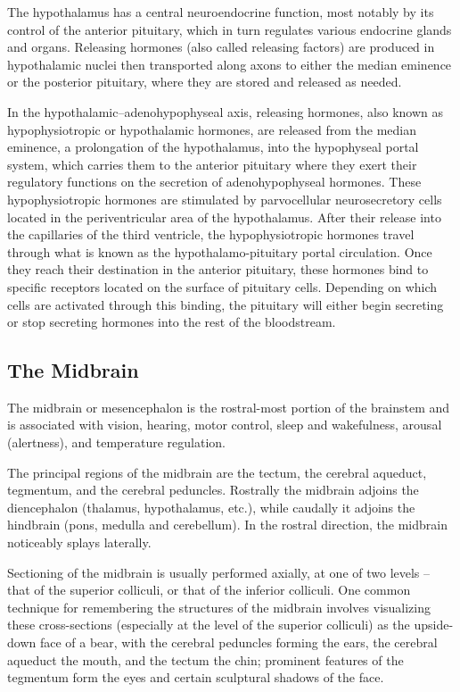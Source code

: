 The hypothalamus has a central neuroendocrine function, most notably by its control of the anterior pituitary, which in turn regulates various endocrine glands and organs. Releasing hormones (also called releasing factors) are produced in hypothalamic nuclei then transported along axons to either the median eminence or the posterior pituitary, where they are stored and released as needed.

In the hypothalamic--adenohypophyseal axis, releasing hormones, also known as hypophysiotropic or hypothalamic hormones, are released from the median eminence, a prolongation of the hypothalamus, into the hypophyseal portal system, which carries them to the anterior pituitary where they exert their regulatory functions on the secretion of adenohypophyseal hormones. These hypophysiotropic hormones are stimulated by parvocellular neurosecretory cells located in the periventricular area of the hypothalamus. After their release into the capillaries of the third ventricle, the hypophysiotropic hormones travel through what is known as the hypothalamo-pituitary portal circulation. Once they reach their destination in the anterior pituitary, these hormones bind to specific receptors located on the surface of pituitary cells. Depending on which cells are activated through this binding, the pituitary will either begin secreting or stop secreting hormones into the rest of the bloodstream.

\hypertarget{the-midbrain}{%
\subsection{The Midbrain}\label{the-midbrain}}

The midbrain or mesencephalon is the rostral-most portion of the brainstem and is associated with vision, hearing, motor control, sleep and wakefulness, arousal (alertness), and temperature regulation.

The principal regions of the midbrain are the tectum, the cerebral aqueduct, tegmentum, and the cerebral peduncles. Rostrally the midbrain adjoins the diencephalon (thalamus, hypothalamus, etc.), while caudally it adjoins the hindbrain (pons, medulla and cerebellum). In the rostral direction, the midbrain noticeably splays laterally.

Sectioning of the midbrain is usually performed axially, at one of two levels -- that of the superior colliculi, or that of the inferior colliculi. One common technique for remembering the structures of the midbrain involves visualizing these cross-sections (especially at the level of the superior colliculi) as the upside-down face of a bear, with the cerebral peduncles forming the ears, the cerebral aqueduct the mouth, and the tectum the chin; prominent features of the tegmentum form the eyes and certain sculptural shadows of the face.

